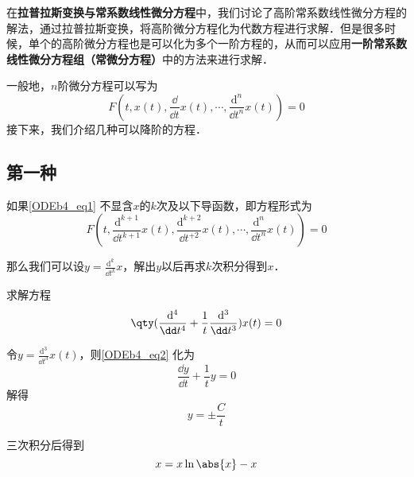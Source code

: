 

在\textbf{拉普拉斯变换与常系数线性微分方程}中，我们讨论了高阶常系数线性微分方程的解法，通过拉普拉斯变换，将高阶微分方程化为代数方程进行求解．但是很多时候，单个的高阶微分方程也是可以化为多个一阶方程的，从而可以应用\textbf{一阶常系数线性微分方程组（常微分方程）}中的方法来进行求解．

一般地，$n$阶微分方程可以写为
\begin{equation}\label{ODEb4_eq1}
F(t, x(t), \frac{\dd}{\dd t}x(t), \cdots, \frac{\mathrm{d}^n}{\dd t^n}x(t))=0
\end{equation}
接下来，我们介绍几种可以降阶的方程．

\subsection{第一种}

如果\autoref{ODEb4_eq1} 不显含$x$的$k$次及以下导函数，即方程形式为
\begin{equation}
F(t, \frac{\mathrm{d}^{k+1}}{\dd t^{k+1}}x(t), \frac{\mathrm{d}^{k+2}}{\dd t^{+2}}x(t), \cdots, \frac{\mathrm{d}^n}{\dd t^n}x(t))=0
\end{equation}

那么我们可以设$y=\frac{\mathrm{d}^k}{\dd t^k}x$，解出$y$以后再求$k$次积分得到$x$．


\begin{example}{}
求解方程
\begin{equation}\label{ODEb4_eq2}
\qty(
    \frac{\mathrm{d}^4}{\dd t^4}+\frac{1}{t}\frac{\mathrm{d}^3}{\dd t^3}
    )
    x(t)=0
\end{equation}

令$y=\frac{\mathrm{d}^3}{\dd t^3}x(t)$，则\autoref{ODEb4_eq2} 化为
\begin{equation}
\frac{\dd y}{\dd t}+\frac{1}{t}y=0
\end{equation}
解得
\begin{equation}
y=\pm\frac{C}{t}
\end{equation}

三次积分后得到
\begin{equation}
x=x\ln\abs{x}-x
\end{equation}



\end{example}





















